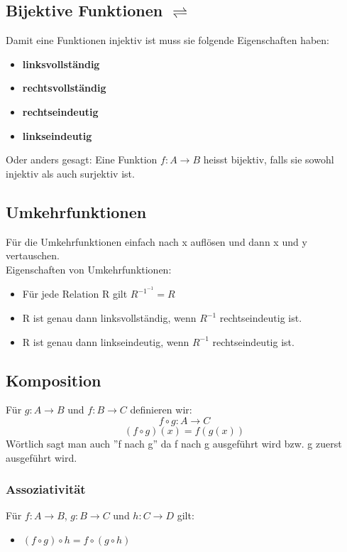\subsection{Bijektive Funktionen $\rightleftharpoons$}
Damit eine Funktionen injektiv ist muss sie folgende Eigenschaften haben:
\begin{itemize}
    \item \textbf{linksvollständig}
    \item \textbf{rechtsvollständig}
    \item \textbf{rechtseindeutig}
    \item \textbf{linkseindeutig}  
\end{itemize}
Oder anders gesagt: Eine Funktion $f : A \rightarrow B$ heisst bijektiv, 
falls sie sowohl injektiv als auch surjektiv ist.
\subsection{Umkehrfunktionen}
Für die Umkehrfunktionen einfach nach x auflösen und dann x und y vertauschen.\\
Eigenschaften von Umkehrfunktionen:
\begin{itemize}
    \item Für jede Relation R gilt $R^{-1^{-1}} = R$
    \item R ist genau dann linksvollständig, wenn $R^{-1}$ rechtseindeutig ist.
    \item R ist genau dann linkseindeutig, wenn $R^{-1}$ rechtseindeutig ist.
\end{itemize}
\subsection{Komposition}
Für $g: A \rightarrow B $ und $f: B \rightarrow C$ definieren wir:
\begin{equation}
    f \circ g: A \rightarrow C
\end{equation}
\begin{equation}
    (f \circ g)(x) = f(g(x))
\end{equation}
Wörtlich sagt man auch ''f nach g'' da f nach g ausgeführt wird bzw. g zuerst ausgeführt wird.
\subsubsection{Assoziativität}
Für $f: A \rightarrow B$, $g: B \rightarrow C$ und $h: C \rightarrow D$ gilt:
\begin{itemize}
    \item $(f \circ g) \circ h = f \circ (g \circ h)$
\end{itemize}